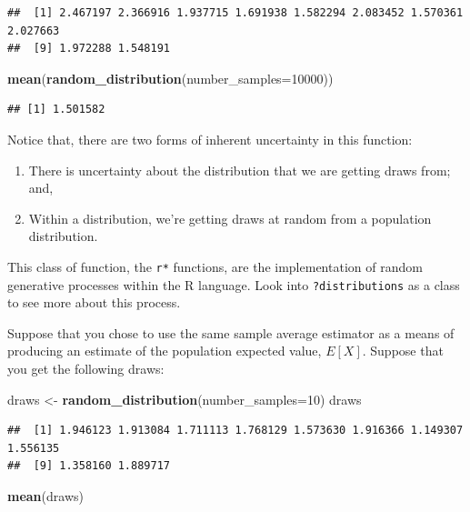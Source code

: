 \documentclass[
]{book}
\newenvironment{Shaded}{\begin{snugshade}}{\end{snugshade}}
\newcommand{\AttributeTok}[1]{\textcolor[rgb]{0.13,0.29,0.53}{#1}}
\newcommand{\DecValTok}[1]{\textcolor[rgb]{0.00,0.00,0.81}{#1}}
\newcommand{\FunctionTok}[1]{\textcolor[rgb]{0.13,0.29,0.53}{\textbf{#1}}}
\newcommand{\NormalTok}[1]{#1}
\newcommand{\OtherTok}[1]{\textcolor[rgb]{0.56,0.35,0.01}{#1}}
\providecommand{\tightlist}{%
  \setlength{\itemsep}{0pt}\setlength{\parskip}{0pt}}
\theoremstyle{definition}
\theoremstyle{definition}
\theoremstyle{definition}
\theoremstyle{definition}
\theoremstyle{remark}
\begin{document}
\begin{verbatim}
##  [1] 2.467197 2.366916 1.937715 1.691938 1.582294 2.083452 1.570361 2.027663
##  [9] 1.972288 1.548191
\end{verbatim}

\begin{Shaded}
\begin{Highlighting}[]
\FunctionTok{mean}\NormalTok{(}\FunctionTok{random\_distribution}\NormalTok{(}\AttributeTok{number\_samples=}\DecValTok{10000}\NormalTok{))}
\end{Highlighting}
\end{Shaded}

\begin{verbatim}
## [1] 1.501582
\end{verbatim}

Notice that, there are two forms of inherent uncertainty in this function:

\begin{enumerate}
\def\labelenumi{\arabic{enumi}.}
\tightlist
\item
  There is uncertainty about the distribution that we are getting draws from; and,
\item
  Within a distribution, we're getting draws at random from a population distribution.
\end{enumerate}

This class of function, the \texttt{r*} functions, are the implementation of random generative processes within the R language. Look into \texttt{?distributions} as a class to see more about this process.

Suppose that you chose to use the same sample average estimator as a means of producing an estimate of the population expected value, \(E[X]\). Suppose that you get the following draws:

\begin{Shaded}
\begin{Highlighting}[]
\NormalTok{draws }\OtherTok{\textless{}{-}} \FunctionTok{random\_distribution}\NormalTok{(}\AttributeTok{number\_samples=}\DecValTok{10}\NormalTok{)}
\NormalTok{draws}
\end{Highlighting}
\end{Shaded}

\begin{verbatim}
##  [1] 1.946123 1.913084 1.711113 1.768129 1.573630 1.916366 1.149307 1.556135
##  [9] 1.358160 1.889717
\end{verbatim}

\begin{Shaded}
\begin{Highlighting}[]
\FunctionTok{mean}\NormalTok{(draws)}
\end{Highlighting}
\end{Shaded}
\end{document}
